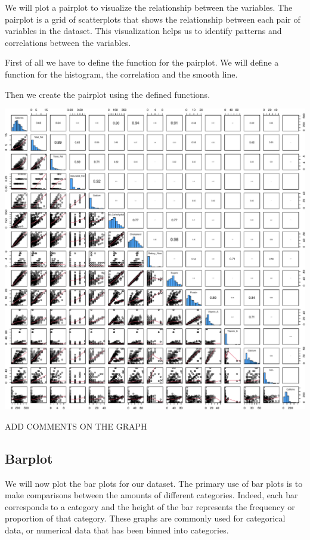 \documentclass[
]{article}
\begin{document}
We will plot a pairplot to visualize the relationship between the
variables. The pairplot is a grid of scatterplots that shows the
relationship between each pair of variables in the dataset. This
visualization helps us to identify patterns and correlations between the
variables.

First of all we have to define the function for the pairplot. We will
define a function for the histogram, the correlation and the smooth
line.

Then we create the pairplot using the defined functions.

\begin{center}\includegraphics{Statistical_Learning_Final_Report_files/figure-latex/pairplot-1} \end{center}

ADD COMMENTS ON THE GRAPH

\subsection{Barplot}\label{barplot}

We will now plot the bar plots for our dataset. The primary use of bar
plots is to make comparisons between the amounts of different
categories. Indeed, each bar corresponds to a category and the height of
the bar represents the frequency or proportion of that category. These
graphs are commonly used for categorical data, or numerical data that
has been binned into categories.
\end{document}
